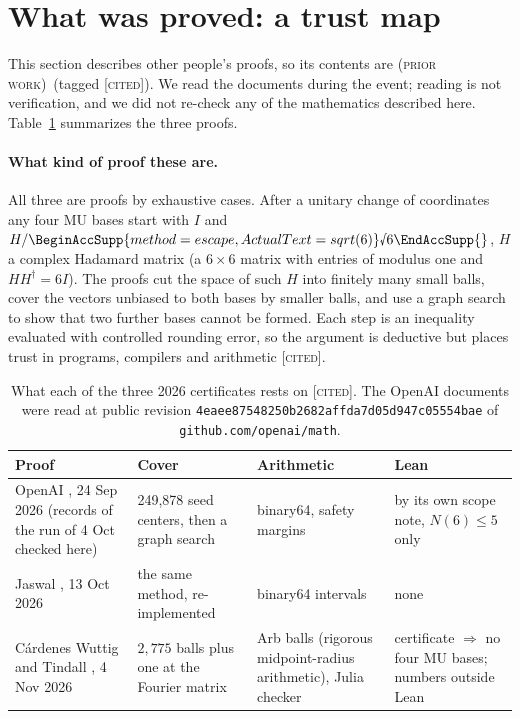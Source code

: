 \documentclass[11pt]{article}
\newcommand{\rnum}[1]{\BeginAccSupp{method=escape,ActualText=sqrt(#1)}\text{\textsurd}#1\EndAccSupp{}}
\newcommand{\rsix}{\rnum{6}}
\newcommand{\st}[1]{\textsc{[#1]}}
\newcommand{\stcited}{\st{cited}}
\newcommand{\prior}{\textsc{(prior work)}}
\theoremstyle{definition}
\theoremstyle{remark}
\begin{document}
\section{What was proved: a trust map}\label{sec:trust}

\noindent This section describes other people's proofs, so its contents are \prior\ (tagged \stcited). We read the
documents during the event; reading is not verification, and we did not re-check any of the mathematics described here.
Table~\ref{tab:trust} summarizes the three proofs.

\paragraph{What kind of proof these are.} All three are proofs by exhaustive cases. After a unitary change of
coordinates any four MU bases start with $I$ and $H/\rsix$, $H$ a complex Hadamard matrix (a $6\times6$ matrix with
entries of modulus one and $HH^\dagger=6I$). The proofs cut the space of such $H$ into finitely many small balls, cover the
vectors unbiased to both bases by smaller balls, and use a graph search to show that two further bases cannot be formed.
Each step is an inequality evaluated with controlled rounding error, so the argument is deductive but places trust in
programs, compilers and arithmetic \cite{OAI,Jaswal1,CWT} \stcited.

\begin{table}[htbp]
\centering\footnotesize
\begin{tabular}{@{}p{}p{}p{}p{}@{}}
\toprule
Proof & Cover & Arithmetic & Lean\\
\midrule
OpenAI \cite{OAI,OAIF}, 24 Sep 2026 (records of the run of 4 Oct checked here) & 249{,}878 seed centers, then a graph search & binary64, safety margins & by its own scope note, $N(6)\le5$ only\\
Jaswal \cite{Jaswal1,Jaswal2}, 13 Oct 2026 & the same method, re-implemented & binary64 intervals & none\\
C\'ardenes Wuttig and Tindall \cite{CWT}, 4 Nov 2026 & $2{,}775$ balls plus one at the Fourier matrix & Arb balls (rigorous midpoint-radius arithmetic), Julia checker & certificate $\Rightarrow$ no four MU bases; numbers outside Lean\\
\bottomrule
\end{tabular}
\caption{What each of the three 2026 certificates rests on \stcited. The OpenAI documents were read at public
revision \texttt{4eaee87548250b2682affda7d05d947c05554bae} of \texttt{github.com/openai/math}.}\label{tab:trust}
\end{table}
\end{document}
